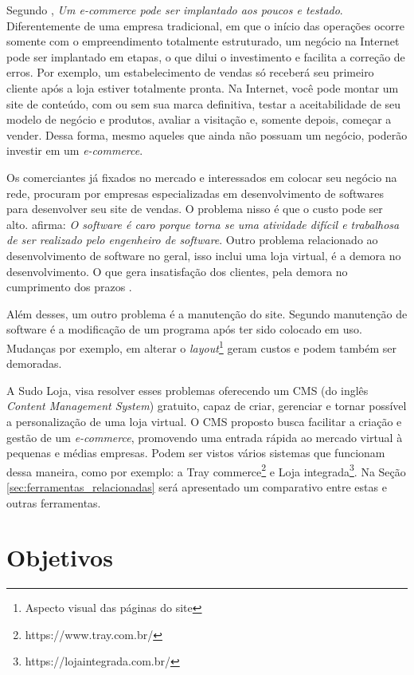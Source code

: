 \documentclass[a4paper,12pt]{monografia}
\begin{document}
Segundo , \textit{Um e-commerce pode ser implantado aos poucos e testado}. Diferentemente de uma empresa tradicional, em que o início das operações ocorre somente com o empreendimento totalmente estruturado, um negócio na Internet pode ser implantado em etapas, o que dilui o investimento e facilita a correção de erros. Por exemplo, um estabelecimento de vendas só receberá seu primeiro cliente após a loja estiver totalmente pronta. Na Internet, você pode montar um site de conteúdo, com ou sem sua marca definitiva, testar a aceitabilidade de seu modelo de negócio e produtos, avaliar a visitação e, somente depois, começar a vender. Dessa forma, mesmo aqueles que ainda não possuam um negócio, poderão investir em um \textit{e-commerce}.

Os comerciantes já fixados no mercado e interessados em colocar seu negócio na rede, procuram por empresas especializadas em desenvolvimento de softwares para desenvolver seu site de vendas. O problema nisso é que o custo pode ser alto.  afirma: \textit{O software é caro porque torna se uma atividade difícil e trabalhosa de ser realizado pelo engenheiro de software}.  Outro problema relacionado ao desenvolvimento de software no geral, isso inclui uma loja virtual, é a demora no desenvolvimento. O que gera insatisfação dos clientes, pela demora no cumprimento dos prazos \cite{pressman}.

Além desses, um outro problema é a manutenção do site. Segundo  manutenção de software é a modificação de um programa após ter sido colocado em uso. Mudanças por exemplo, em alterar o \textit{layout}\footnote{Aspecto visual das páginas do site} geram custos e podem também ser demoradas.

A Sudo Loja, visa resolver esses problemas oferecendo um CMS (do inglês \textit{Content Management System}) gratuito, capaz de criar, gerenciar e tornar possível a personalização de uma loja virtual. O CMS proposto busca facilitar a criação e gestão de um \textit{e-commerce}, promovendo uma entrada rápida ao mercado virtual à pequenas e médias empresas. Podem ser vistos vários sistemas que funcionam dessa maneira, como por exemplo: a Tray commerce\footnote{https://www.tray.com.br/} e Loja integrada\footnote{https://lojaintegrada.com.br/}. Na Seção \ref{sec:ferramentas_relacionadas} será apresentado um comparativo entre estas e outras ferramentas.



\section{Objetivos} %
\label{sec:objetivos}
\end{document}
